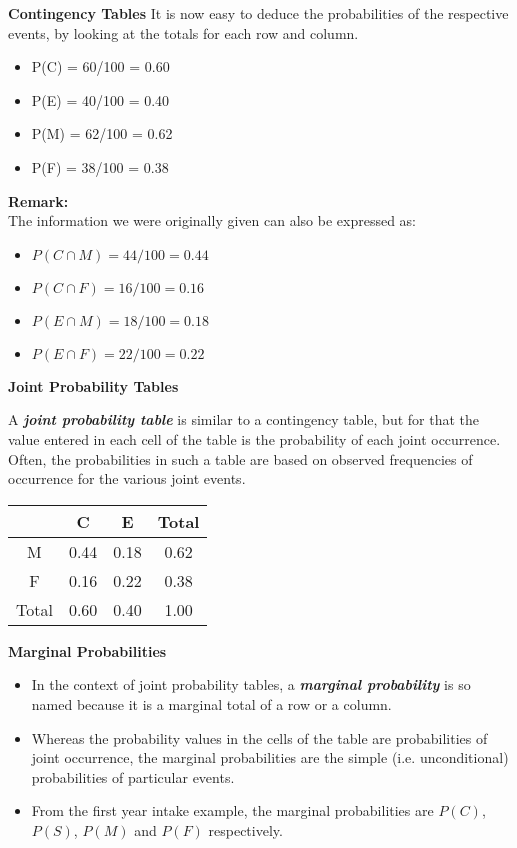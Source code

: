 \documentclass[]{report}
\begin{document}
{
	\textbf{Contingency Tables}
	It is now easy to deduce the probabilities of the respective events, by looking at the totals for each row and column.
	\begin{itemize}
		\item P(C) = 60/100 = 0.60
		\item P(E) = 40/100 = 0.40
		\item P(M) = 62/100 = 0.62
		\item P(F) = 38/100 = 0.38
	\end{itemize}
	\textbf{Remark:}\\
	The information we were originally given can also be expressed as:
	\begin{itemize}
		\item $P(C \cap M) = 44/100 = 0.44$
		\item $P(C \cap F) = 16/100 = 0.16$
		\item $P(E \cap M) = 18/100 = 0.18$
		\item $P(E \cap F) = 22/100 = 0.22$
	\end{itemize}
}
{
	\textbf{Joint Probability Tables}
	
	A \textbf{\emph{joint probability table}} is similar to a contingency table, but for that the value entered in
	each cell of the table is the probability of each joint occurrence. Often, the probabilities in such a table are based
	on observed frequencies of occurrence for the various joint events.
	\begin{center}
		\begin{tabular}{|c||c|c||c|}
			\hline
			& C & E & Total \\ \hline \hline
			M & 0.44 & 0.18 & 0.62 \\ \hline
			F & 0.16 & 0.22 & 0.38 \\ \hline \hline
			Total & 0.60 & 0.40 & 1.00 \\ \hline
		\end{tabular}
	\end{center}
}
{
	\textbf{Marginal Probabilities}
	\begin{itemize}
		\item In the context of joint probability tables, a  \textbf{\emph{marginal probability}} is so named because it is a marginal total of
		a row or a column. \item Whereas the probability values in the cells of the table are probabilities of joint occurrence, the marginal
		probabilities are the simple (i.e. unconditional) probabilities of particular events.
		\item From the first year intake example, the marginal probabilities are $P(C)$, $P(S)$, $P(M)$ and $P(F)$ respectively.
	\end{itemize}
	
}
\end{document}

